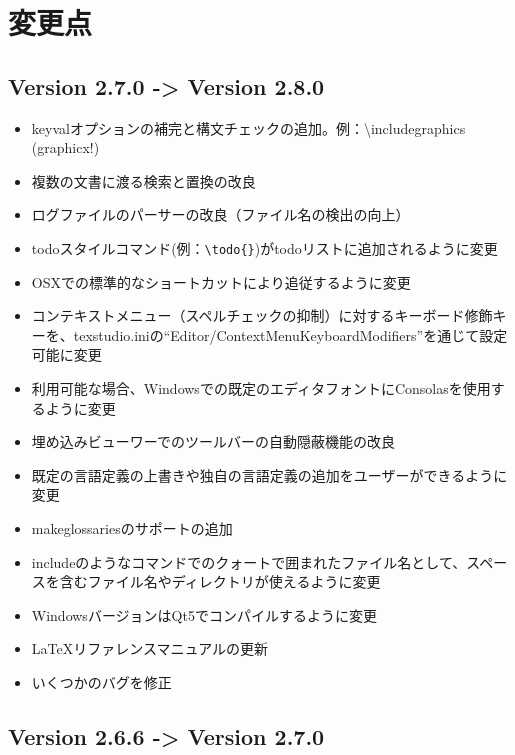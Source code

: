 \chapter{変更点}

\section{Version 2.7.0 -\textgreater{} Version 2.8.0}

\begin{itemize}
\item
  keyvalオプションの補完と構文チェックの追加。例：\textbackslash{}includegraphics (graphicx!)
\item
  複数の文書に渡る検索と置換の改良
\item
  ログファイルのパーサーの改良（ファイル名の検出の向上）
\item
  todoスタイルコマンド(例：\lstinline!\todo{}!)がtodoリストに追加されるように変更
\item
  OSXでの標準的なショートカットにより追従するように変更
\item
  コンテキストメニュー（スペルチェックの抑制）に対するキーボード修飾キーを、texstudio.iniの``Editor/ContextMenuKeyboardModifiers''を通じて設定可能に変更
\item
  利用可能な場合、Windowsでの既定のエディタフォントにConsolasを使用するように変更
\item
  埋め込みビューワーでのツールバーの自動隠蔽機能の改良
\item
  既定の言語定義の上書きや独自の言語定義の追加をユーザーができるように変更
\item
  makeglossariesのサポートの追加
\item
  includeのようなコマンドでのクォートで囲まれたファイル名として、スペースを含むファイル名やディレクトリが使えるように変更
\item
  WindowsバージョンはQt5でコンパイルするように変更
\item
  LaTeXリファレンスマニュアルの更新
\item
  いくつかのバグを修正
\end{itemize}

\section{Version 2.6.6 -\textgreater{} Version 2.7.0}

